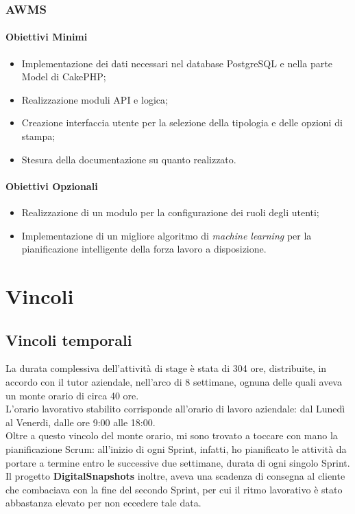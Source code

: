 \subsubsection*{AWMS}
\paragraph*{Obiettivi Minimi}
\begin{itemize}
\item Implementazione dei dati necessari nel database PostgreSQL e nella parte Model di CakePHP;
\item Realizzazione moduli API e logica;
\item Creazione interfaccia utente per la selezione della tipologia e delle opzioni di stampa; 
\item Stesura della documentazione su quanto realizzato.
\end{itemize}

\paragraph*{Obiettivi Opzionali}
\begin{itemize}
\item Realizzazione di un modulo per la configurazione dei ruoli degli utenti;
\item Implementazione di un migliore algoritmo di \textit{machine learning} per la pianificazione intelligente della forza lavoro a disposizione.
\end{itemize}

\section{Vincoli}
\subsection{Vincoli temporali}

La durata complessiva dell'attività di stage è stata di 304 ore, distribuite, in accordo con il tutor aziendale, nell'arco di 8 settimane, ognuna delle quali aveva un monte orario di circa 40 ore. \\
L'orario lavorativo stabilito corrisponde all'orario di lavoro aziendale: dal Lunedì al Venerdi, dalle ore 9:00 alle 18:00.\\
Oltre a questo vincolo del monte orario, mi sono trovato a toccare con mano la pianificazione Scrum: all'inizio di ogni Sprint, infatti, ho pianificato le attività da portare a termine entro le successive due settimane, durata di ogni singolo Sprint.\\
Il progetto \textbf{DigitalSnapshots} inoltre, aveva una scadenza di consegna al cliente che combaciava con la fine del secondo Sprint, per cui il ritmo lavorativo è stato abbastanza elevato per non eccedere tale data.


